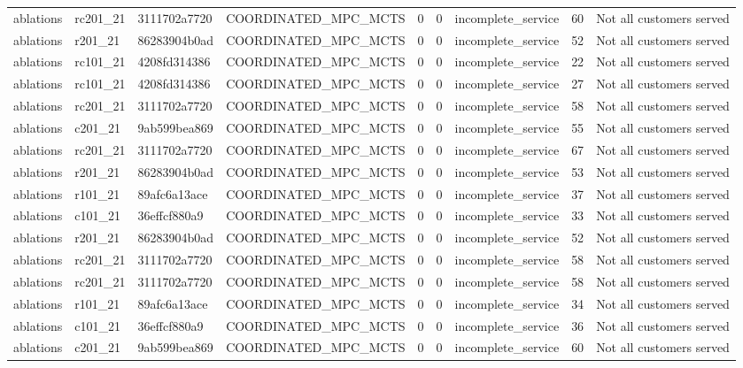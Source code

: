 \begin{table}
{\begin{tabular}{llllrrlrl}
ablations & rc201\_21 & 3111702a7720 & COORDINATED\_MPC\_MCTS & 0 & 0 & incomplete\_service & 60 & Not all customers served \\
ablations & r201\_21 & 86283904b0ad & COORDINATED\_MPC\_MCTS & 0 & 0 & incomplete\_service & 52 & Not all customers served \\
ablations & rc101\_21 & 4208fd314386 & COORDINATED\_MPC\_MCTS & 0 & 0 & incomplete\_service & 22 & Not all customers served \\
ablations & rc101\_21 & 4208fd314386 & COORDINATED\_MPC\_MCTS & 0 & 0 & incomplete\_service & 27 & Not all customers served \\
ablations & rc201\_21 & 3111702a7720 & COORDINATED\_MPC\_MCTS & 0 & 0 & incomplete\_service & 58 & Not all customers served \\
ablations & c201\_21 & 9ab599bea869 & COORDINATED\_MPC\_MCTS & 0 & 0 & incomplete\_service & 55 & Not all customers served \\
ablations & rc201\_21 & 3111702a7720 & COORDINATED\_MPC\_MCTS & 0 & 0 & incomplete\_service & 67 & Not all customers served \\
ablations & r201\_21 & 86283904b0ad & COORDINATED\_MPC\_MCTS & 0 & 0 & incomplete\_service & 53 & Not all customers served \\
ablations & r101\_21 & 89afc6a13ace & COORDINATED\_MPC\_MCTS & 0 & 0 & incomplete\_service & 37 & Not all customers served \\
ablations & c101\_21 & 36effcf880a9 & COORDINATED\_MPC\_MCTS & 0 & 0 & incomplete\_service & 33 & Not all customers served \\
ablations & r201\_21 & 86283904b0ad & COORDINATED\_MPC\_MCTS & 0 & 0 & incomplete\_service & 52 & Not all customers served \\
ablations & rc201\_21 & 3111702a7720 & COORDINATED\_MPC\_MCTS & 0 & 0 & incomplete\_service & 58 & Not all customers served \\
ablations & rc201\_21 & 3111702a7720 & COORDINATED\_MPC\_MCTS & 0 & 0 & incomplete\_service & 58 & Not all customers served \\
ablations & r101\_21 & 89afc6a13ace & COORDINATED\_MPC\_MCTS & 0 & 0 & incomplete\_service & 34 & Not all customers served \\
ablations & c101\_21 & 36effcf880a9 & COORDINATED\_MPC\_MCTS & 0 & 0 & incomplete\_service & 36 & Not all customers served \\
ablations & c201\_21 & 9ab599bea869 & COORDINATED\_MPC\_MCTS & 0 & 0 & incomplete\_service & 60 & Not all customers served \\

\end{tabular}}
\end{table}
